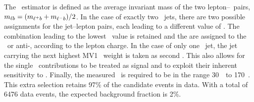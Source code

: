 The \mlb\ estimator is defined as the average invariant mass of the two lepton--\bjet\ pairs, $m_{\ell b}=(m_{\ell^+ b}+m_{\ell^- b})/2$. 
%
In the case of exactly two \btagged\ jets, there are two possible assignments for the jet--lepton pairs, each leading to a different value of \mlb. 
%
The combination leading to the lowest \mlb\ value is retained and the  are assigned to the \tquark\ or anti-\tquark, according to the lepton charge. 
%
In the case of only one \btagged\ jet, the jet carrying the next highest MV1 \btag\ weight is taken as second \bjet. 
%
This also allows for the single \tquark\ contributions to be treated as signal and to exploit their inherent sensitivity to \mt.
%
Finally, the measured \mlbr\ is required to be in the range 30~\GeV\ to 170~\GeV. 
%
This extra selection retains 97\% of the candidate events in data. 
%
With a total of 6476 data events, the expected background fraction is 2\%. 











